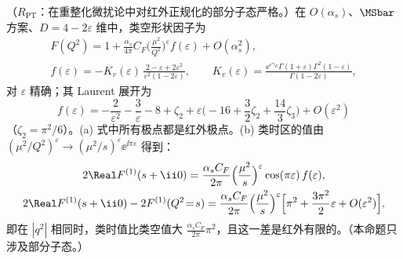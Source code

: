 \begin{proposition}\label{prop:sudakov-oneloop}
（$R_{\mathrm{PT}}$：在重整化微扰论中对红外正规化的部分子态严格。）在 $O(\alpha_s)$、$\MSbar$ 方案、$D=4-2\varepsilon$ 维中，类空形状因子为
\begin{equation}\label{eq:sudakov-F1}
\begin{gathered}
F(Q^2)=1+\frac{\alpha_s}{4\pi}C_F\Big(\frac{\mu^2}{Q^2}\Big)^{\varepsilon}f(\varepsilon)+O(\alpha_s^2),\\
f(\varepsilon)=-K_v(\varepsilon)\,\frac{2-\varepsilon+2\varepsilon^2}{\varepsilon^2(1-2\varepsilon)},\qquad
K_v(\varepsilon)=\frac{\ee^{\varepsilon\gamma_E}\Gamma(1+\varepsilon)\Gamma^2(1-\varepsilon)}{\Gamma(1-2\varepsilon)},
\end{gathered}
\end{equation}
对 $\varepsilon$ 精确；其 Laurent 展开为
\begin{equation}\label{eq:sudakov-F1-exp}
f(\varepsilon)=-\frac2{\varepsilon^2}-\frac3\varepsilon-8+\zeta_2+\varepsilon\Big(-16+\frac32\zeta_2+\frac{14}3\zeta_3\Big)+O(\varepsilon^2)
\end{equation}
（$\zeta_2=\pi^2/6$）。(a) 式中所有极点都是红外极点。(b) 类时区的值由 $(\mu^2/Q^2)^\varepsilon\to(\mu^2/s)^\varepsilon\ee^{\ii\pi\varepsilon}$ 得到：
\begin{equation}\label{eq:sudakov-F1-timelike}
\begin{gathered}
2\Real F^{(1)}(s+\ii0)=\frac{\alpha_sC_F}{2\pi}\Big(\frac{\mu^2}{s}\Big)^{\varepsilon}\cos(\pi\varepsilon)\,f(\varepsilon),\\
2\Real F^{(1)}(s+\ii0)-2F^{(1)}(Q^2\!=\!s)=\frac{\alpha_sC_F}{2\pi}\Big(\frac{\mu^2}{s}\Big)^{\varepsilon}\Big[\pi^2+\frac{3\pi^2}{2}\varepsilon+O(\varepsilon^2)\Big],
\end{gathered}
\end{equation}
即在 $|q^2|$ 相同时，类时值比类空值大 $\frac{\alpha_sC_F}{2\pi}\pi^2$，且这一差是红外有限的。（本命题只涉及部分子态。）
\end{proposition}

